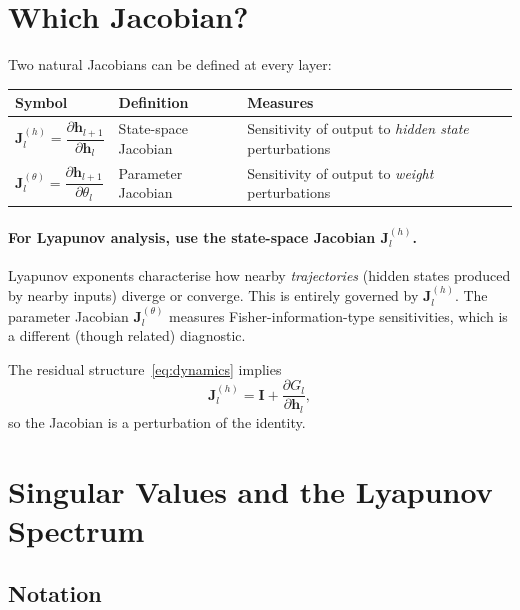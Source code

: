\documentclass[11pt]{article}
\newcommand{\vect}[1]{\bm{#1}}
\newcommand{\mat}[1]{\mathbf{#1}}
\begin{document}
\section{Which Jacobian?}

Two natural Jacobians can be defined at every layer:

\begin{center}
\begin{tabular}{lll}
\toprule
\textbf{Symbol} & \textbf{Definition} & \textbf{Measures} \\
\midrule
$\mat{J}_l^{(h)} = \dfrac{\partial \vect{h}_{l+1}}{\partial \vect{h}_l}$ &
    State-space Jacobian &
    Sensitivity of output to \emph{hidden state} perturbations \\[8pt]
$\mat{J}_l^{(\theta)} = \dfrac{\partial \vect{h}_{l+1}}{\partial \theta_l}$ &
    Parameter Jacobian &
    Sensitivity of output to \emph{weight} perturbations \\
\bottomrule
\end{tabular}
\end{center}

\paragraph{For Lyapunov analysis, use the state-space Jacobian $\mat{J}_l^{(h)}$.}
Lyapunov exponents characterise how nearby \emph{trajectories} (hidden
states produced by nearby inputs) diverge or converge.  This is entirely
governed by $\mat{J}_l^{(h)}$.  The parameter Jacobian
$\mat{J}_l^{(\theta)}$ measures Fisher-information-type sensitivities,
which is a different (though related) diagnostic.

The residual structure~\eqref{eq:dynamics} implies
\begin{equation}\label{eq:jacobian-residual}
    \mat{J}_l^{(h)}
        = \mat{I} + \frac{\partial G_l}{\partial \vect{h}_l},
\end{equation}
so the Jacobian is a perturbation of the identity.

\section{Singular Values and the Lyapunov Spectrum}

\subsection{Notation}
\end{document}

